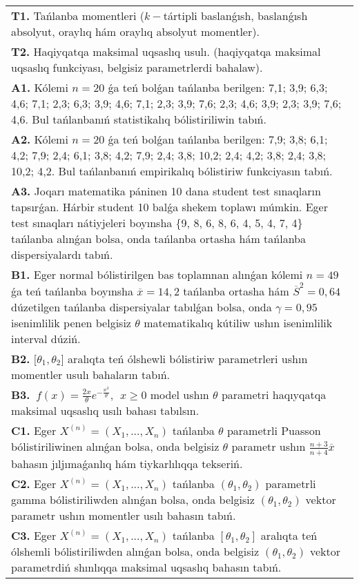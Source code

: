 \documentclass{article}
\begin{document}
\begin{tabular}{m{17cm}}
\textbf{T1.} 
Tańlanba momentleri (\(k -\)tártipli baslanǵısh, baslanǵısh absolyut, oraylıq hám oraylıq absolyut momentler).
 \\
\textbf{T2.} 
Haqiyqatqa maksimal uqsaslıq usulı. (haqiyqatqa maksimal uqsaslıq funkciyası, belgisiz parametrlerdi bahalaw).
 \\
\textbf{A1.} 
Kólemi \(n = 20\) ǵa teń bolǵan tańlanba berilgen: 7,1; 3,9; 6,3; 4,6; 7,1; 2,3; 6,3; 3,9; 4,6; 7,1; 2,3; 3,9; 7,6; 2,3; 4,6; 3,9; 2,3; 3,9; 7,6; 4,6. Bul tańlanbanıń statistikalıq bólistiriliwin tabıń.
 \\
\textbf{A2.} 
Kólemi \(n = 20\) ǵa teń bolǵan tańlanba berilgen: 7,9; 3,8; 6,1; 4,2; 7,9; 2,4; 6,1; 3,8; 4,2; 7,9; 2,4; 3,8; 10,2; 2,4; 4,2; 3,8; 2,4; 3,8; 10,2; 4,2. Bul tańlanbanıń empirikalıq bólistiriw funkciyasın tabıń.
 \\
\textbf{A3.} 
Joqarı matematika páninen 10 dana student test sınaqların tapsırǵan. Hárbir student 10 balǵa shekem toplawı múmkin. Eger test sınaqları nátiyjeleri boyınsha \{9, 8, 6, 8, 6, 4, 5, 4, 7, 4\} tańlanba alınǵan bolsa, onda tańlanba ortasha hám tańlanba dispersiyalardı tabıń.
 \\
\textbf{B1.} 
Eger normal bólistirilgen bas toplamnan alınǵan kólemi \(n = 49\) ǵa teń tańlanba boyınsha \(\overline{x} = 14,2\) tańlanba ortasha hám \({\overline{S}}^{2} = 0,64\) dúzetilgen tańlanba dispersiyalar tabılǵan bolsa, onda \(\gamma = 0,95\) isenimlilik penen belgisiz \(\theta\) matematikalıq kútiliw ushın isenimlilik interval dúziń.
 \\
\textbf{B2.} 
\(\lbrack\theta_{1},\theta_{2}\rbrack\) aralıqta teń ólshewli bólistiriw parametrleri ushın momentler usulı bahaların tabıń.
 \\
\textbf{B3.} 
\(\ f(x) = \frac{2x}{\theta}e^{- \frac{x^{2}}{\theta}},\ \ x \geq 0\) model ushın \(\theta\) parametri haqıyqatqa maksimal uqsaslıq usılı bahası tabılsın.
 \\
\textbf{C1.} 
Eger \(X^{(n)} = \left( X_{1},...,X_{n} \right)\) tańlanba \(\theta\) parametrli Puasson bólistiriliwinen alınǵan bolsa, onda belgisiz \(\theta\) parametr ushın \(\frac{n + 3}{n + 4}\overline{x}\) bahasın jıljımaǵanlıq hám tiykarlılıqqa tekseriń.
 \\
\textbf{C2.} 
Eger \(X^{(n)} = \left( X_{1},...,X_{n} \right)\) tańlanba \(\left( \theta_{1},\theta_{2} \right)\) parametrli gamma bólistiriliwden alınǵan bolsa, onda belgisiz \(\left( \theta_{1},\theta_{2} \right)\) vektor parametr ushın momentler usılı bahasın tabıń.
 \\
\textbf{C3.} 
Eger \(X^{(n)} = \left( X_{1},...,X_{n} \right)\) tańlanba \(\left\lbrack \theta_{1},\theta_{2} \right\rbrack\) aralıqta teń ólshemli bólistiriliwden alınǵan bolsa, onda belgisiz \(\left( \theta_{1},\theta_{2} \right)\) vektor parametrdiń shınlıqqa maksimal uqsaslıq bahasın tabıń.
 \\

\end{tabular}
\vspace{1cm}
\end{document}
